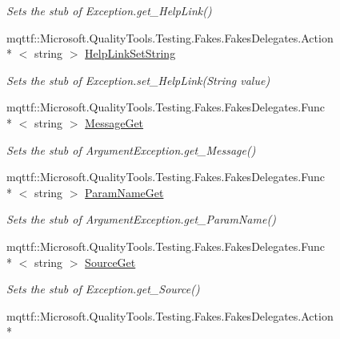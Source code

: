 \begin{DoxyCompactItemize}
\begin{DoxyCompactList}\small\item\em Sets the stub of Exception.\-get\-\_\-\-Help\-Link()\end{DoxyCompactList}\item 
mqttf\-::\-Microsoft.\-Quality\-Tools.\-Testing.\-Fakes.\-Fakes\-Delegates.\-Action\\*
$<$ string $>$ \hyperlink{class_system_1_1_component_model_1_1_fakes_1_1_stub_invalid_asynchronous_state_exception_a49a5253eb875f6dd9d8609a4d1064ccc}{Help\-Link\-Set\-String}
\begin{DoxyCompactList}\small\item\em Sets the stub of Exception.\-set\-\_\-\-Help\-Link(\-String value)\end{DoxyCompactList}\item 
mqttf\-::\-Microsoft.\-Quality\-Tools.\-Testing.\-Fakes.\-Fakes\-Delegates.\-Func\\*
$<$ string $>$ \hyperlink{class_system_1_1_component_model_1_1_fakes_1_1_stub_invalid_asynchronous_state_exception_a3c464dd0cf5fe70fd1eac99217c85cb8}{Message\-Get}
\begin{DoxyCompactList}\small\item\em Sets the stub of Argument\-Exception.\-get\-\_\-\-Message()\end{DoxyCompactList}\item 
mqttf\-::\-Microsoft.\-Quality\-Tools.\-Testing.\-Fakes.\-Fakes\-Delegates.\-Func\\*
$<$ string $>$ \hyperlink{class_system_1_1_component_model_1_1_fakes_1_1_stub_invalid_asynchronous_state_exception_aa8b687241dae71933b1f6d35970f2937}{Param\-Name\-Get}
\begin{DoxyCompactList}\small\item\em Sets the stub of Argument\-Exception.\-get\-\_\-\-Param\-Name()\end{DoxyCompactList}\item 
mqttf\-::\-Microsoft.\-Quality\-Tools.\-Testing.\-Fakes.\-Fakes\-Delegates.\-Func\\*
$<$ string $>$ \hyperlink{class_system_1_1_component_model_1_1_fakes_1_1_stub_invalid_asynchronous_state_exception_abcabc55ec2228937200850722fd087af}{Source\-Get}
\begin{DoxyCompactList}\small\item\em Sets the stub of Exception.\-get\-\_\-\-Source()\end{DoxyCompactList}\item 
mqttf\-::\-Microsoft.\-Quality\-Tools.\-Testing.\-Fakes.\-Fakes\-Delegates.\-Action\\*

\end{DoxyCompactItemize}

